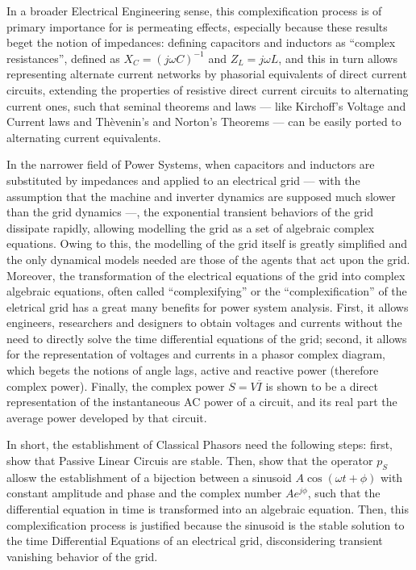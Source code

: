	In a broader Electrical Engineering sense, this complexification process is of primary importance for is permeating effects, especially because these results beget the notion of impedances: defining capacitors and inductors as ``complex resistances'', defined as $X_C = \left(j\omega C\right)^{-1}$ and $Z_L = j\omega L$, and this in turn allows representing alternate current networks by phasorial equivalents of direct current circuits, extending the properties of resistive direct current circuits to alternating current ones, such that seminal theorems and laws — like Kirchoff's Voltage and Current laws and Thèvenin's and Norton's Theorems — can be easily ported to alternating current equivalents.

	In the narrower field of Power Systems, when capacitors and inductors are substituted by impedances and applied to an electrical grid — with the assumption that the machine and inverter dynamics are supposed much slower than the grid dynamics —, the exponential transient behaviors of the grid dissipate rapidly, allowing modelling the grid as a set of algebraic complex equations. Owing to this, the modelling of the grid itself is greatly simplified and the only dynamical models needed are those of the agents that act upon the grid. Moreover, the transformation of the electrical equations of the grid into complex algebraic equations, often called ``complexifying'' or the ``complexification'' of the eletrical grid has a great many benefits for power system analysis. First, it allows engineers, researchers and designers to obtain voltages and currents without the need to directly solve the time differential equations of the grid; second, it allows for the representation of voltages and currents in a phasor complex diagram, which begets the notions of angle lags, active and reactive power (therefore complex power). Finally, the complex power $S = V \overline{I}$ is shown to be a direct representation of the instantaneous AC power of a circuit, and its real part the average power developed by that circuit.

	In short, the establishment of Classical Phasors need the following steps: first, show that Passive Linear Circuis are stable. Then, show that the operator $p_S$ allosw the establishment of a bijection between a sinusoid $A\cos\left(\omega t + \phi\right)$ with constant amplitude and phase and the complex number $Ae^{j\phi}$, such that the differential equation in time is transformed into an algebraic equation. Then, this complexification process is justified because the sinusoid is the stable solution to the time Differential Equations of an electrical grid, disconsidering transient vanishing behavior of the grid.

